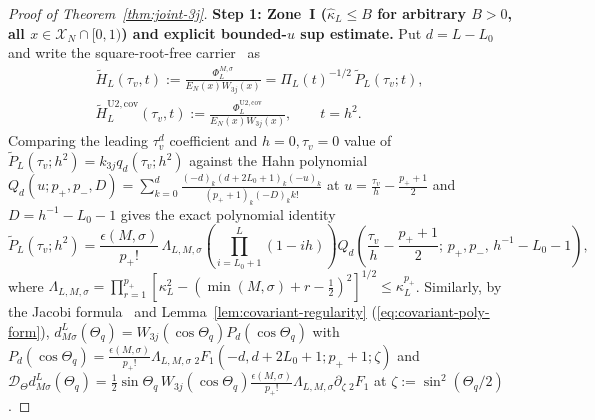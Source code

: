 \documentclass[11pt]{article}
\theoremstyle{definition}
\theoremstyle{remark}
\newcommand{\cD}{\mathcal{D}}
\newcommand{\cX}{\mathcal{X}}
\renewcommand{\_}{\oldunderscore\penalty0\hskip0pt\relax}
\begin{document}
\begin{proof}[Proof of Theorem~\ref{thm:joint-3j}]
\medskip
\noindent\textbf{Step 1: Zone~I ($\hat{\kappa}_L\le B$ for arbitrary $B>0$, all $x\in\cX_N\cap[0,1)$) and explicit bounded-$u$ sup estimate.}
Put $d=L-L_0$ and write the square-root-free carrier~\cite[Lemmas~5.4 and~5.5, Eqs.~(76) and~(52)]{LewisFixedRank} as
\begin{equation}
\begin{gathered}
  \widetilde{H}_L(\tau_v,t) := \frac{\Phi_L^{M,\sigma}}{E_N(x)W_{3j}(x)} = \Pi_L(t)^{-1/2}\,\widetilde{P}_L(\tau_v;t),\\
  \widetilde{H}_L^{\mathrm{U2,cov}}(\tau_v,t) := \frac{\Phi_L^{\mathrm{U2,cov}}}{E_N(x)W_{3j}(x)},\qquad t=h^2.
\end{gathered}
\end{equation}
Comparing the leading $\tau_v^d$ coefficient and $h=0,\tau_v=0$ value of $\widetilde{P}_L(\tau_v;h^2)=k_{3j}q_d(\tau_v;h^2)$ against the
  Hahn polynomial $Q_d(u;p_+,p_-,D)=\sum_{k=0}^d\frac{(-d)_k(d+2L_0+1)_k(-u)_k}{(p_++1)_k(-D)_k k!}$ at
  $u=\frac{\tau_v}{h}-\frac{p_++1}{2}$ and $D=h^{-1}-L_0-1$ gives the exact polynomial identity
\begin{equation}
  \widetilde{P}_L(\tau_v;h^2) =
    \frac{\epsilon(M,\sigma)}{p_+!}\,\Lambda_{L,M,\sigma}\left(\prod_{i=L_0+1}^L(1-ih)\right)Q_d\!\left(\frac{\tau_v}{h}-\frac{p_++1}{2};\,p_+,p_-,\,h^{-1}-L_0-1\right),
  \label{eq:Ptilde-Hahn-exact}
\end{equation}
where $\Lambda_{L,M,\sigma}=\prod_{r=1}^{p_+}[\kappa_L^2-(\min(M,\sigma)+r-\frac12)^2]^{1/2}\le\kappa_L^{p_+}$. Similarly, by
  the Jacobi formula~\cite[Eq.~(68)]{LewisFixedRank} and Lemma~\ref{lem:covariant-regularity}
  (\eqref{eq:covariant-poly-form}), $d^L_{M\sigma}(\Theta_q)=W_{3j}(\cos\Theta_q)P_d(\cos\Theta_q)$ with
  $P_d(\cos\Theta_q)=\frac{\epsilon(M,\sigma)}{p_+!}\Lambda_{L,M,\sigma}\,{}_2F_1(-d,d+2L_0+1;p_++1;\zeta)$ and $\cD_\Theta
  d^L_{M\sigma}(\Theta_q)=\frac12\sin\Theta_q\,W_{3j}(\cos\Theta_q)\frac{\epsilon(M,\sigma)}{p_+!}\Lambda_{L,M,\sigma}\partial_\zeta\,{}_2F_1$
  at $\zeta:=\sin^2(\Theta_q/2)$.


\end{proof}
\end{document}

